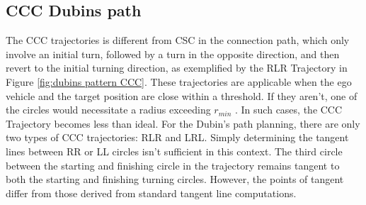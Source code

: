 \subsection{CCC Dubins path}

The CCC trajectories is different from CSC in the connection path, which only involve an initial turn, followed by a turn in the opposite direction, and then revert to the initial turning direction, as exemplified by the RLR Trajectory in Figure \ref{fig:dubins pattern CCC}. These trajectories are applicable when the ego vehicle and the target position are close within a threshold. If they aren't, one of the circles would necessitate a radius exceeding $r_{min}$ . In such cases, the CCC Trajectory becomes less than ideal. For the Dubin's path planning, there are only two types of CCC trajectories: RLR and LRL. Simply determining the tangent lines between RR or LL circles isn't sufficient in this context. The third circle between the starting and finishing circle in the trajectory remains tangent to both the starting and finishing turning circles. However, the points of tangent differ from those derived from standard tangent line computations. 


